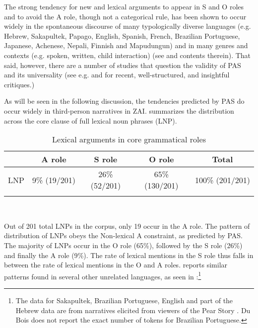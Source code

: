 The strong tendency for new and lexical arguments to appear in S and O roles and to avoid the A role, though not a categorical rule, has been shown to occur widely in the spontaneous discourse of many typologically diverse languages (e.g. Hebrew, Sakapultek, Papago, English, Spanish, French, Brazilian Portuguese, Japanese, Achenese, Nepali, Finnish and Mapudungun) and in many genres and contexts (e.g. spoken, written, child interaction) (see \citealt{dubois2003} and contents therein). That said, however, there are a number of studies that question the validity of PAS and its universality (see e.g. \citealt{haig2016} and \citealt{schnell2017} for recent, well-structured, and insightful critiques.)

As will be seen in the following discussion, the tendencies predicted by PAS do occur widely in third-person narratives in ZAI.  summarizes the distribution across the core clause of full lexical noun phrases (LNP).


\begin{table} 

\caption{{Lexical arguments in core grammatical roles}}
\begin{tabular}{ l  c  c  c  c }
\lsptoprule
 & A role & S role & O role &  {Total} \\

\midrule
 \textsc{LNP} & 9{\%} (19/201) & 26{\%}(52/201) & 65{\%} (130/201) & 100{\%} (201/201) \\
  
\lspbottomrule
\end{tabular}\\
\label{generaldist} 
\end{table}

Out of 201 total LNPs in the corpus, only 19 occur in the A role. The pattern of distribution of LNPs obeys the Non-lexical A constraint, as predicted by PAS. The majority of LNPs occur in the O role (65{\%}), followed by the S role (26{\%}) and finally the A role (9{\%}).  The rate of lexical mentions in the S role thus falls in between the rate of lexical mentions in the O and A roles. \citet[37]{dubois2003b} reports similar patterns found in several other unrelated languages, as seen in :\footnote{The data for Sakapultek, Brazilian Portuguese, English and part of the Hebrew data are from narratives elicited from viewers of the Pear Story \citep[62-63]{dubois2003a}. Du Bois does not report the exact number of tokens for Brazilian Portuguese.}


